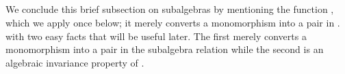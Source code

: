\begin{code}
%
\>[2]\AgdaSpace{}%
\AgdaSymbol{:}\AgdaSpace{}%
\AgdaSpace{}%
\AgdaSymbol{(}\AgdaSpace{}%
\AgdaSymbol{)}\AgdaSpace{}%
\AgdaSymbol{(}\AgdaSpace{}%
\AgdaSymbol{)}\AgdaSpace{}%
\<%
\\
%
\>[2]\AgdaSpace{}%
\AgdaSpace{}%
\AgdaSymbol{=}\AgdaSpace{}%
\AgdaSpace{}%
\AgdaSpace{}%
\AgdaSpace{}%
\AgdaSpace{}%
\AgdaSpace{}%
\AgdaSpace{}%
\AgdaSpace{}%
\<%
\\
%
\>[2]\AgdaSpace{}%
\AgdaSymbol{:}\AgdaSpace{}%
\AgdaSpace{}%
\<%
\\
%
\>[2]\AgdaSpace{}%
\AgdaSymbol{=}\AgdaSpace{}%
\AgdaSpace{}%
\AgdaSpace{}%
\AgdaSpace{}%
\AgdaSpace{}%
\AgdaSpace{}%
\AgdaSpace{}%
\AgdaSpace{}%
\AgdaSpace{}%
\AgdaSymbol{(}\AgdaSpace{}%
\AgdaSymbol{)}\<%
\\
\>[0]\<%
\end{code}
\fi

We conclude this brief subsection on subalgebras
\ifshort
by mentioning the function , which we apply once below; it merely converts a monomorphism into a pair in .
\else
with two easy facts
that will be useful later. The first merely converts a monomorphism into a pair in the subalgebra relation
while the second is an algebraic invariance property of .

